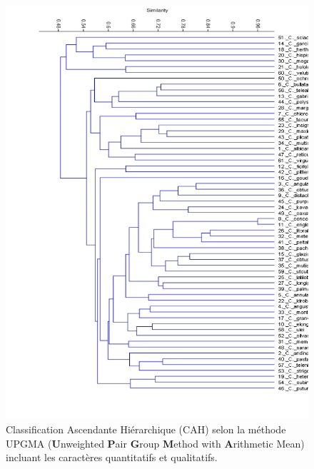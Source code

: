 \documentclass[a4paper]{article}
\theoremstyle{definition}
\theoremstyle{definition}
\theoremstyle{definition}
\theoremstyle{remark}
\begin{document}
\begin{figure}[H]

{\centering \includegraphics[width=1\linewidth]{figure/fig10a} 

}

\caption{Classification Ascendante Hiérarchique (CAH) selon la
méthode UPGMA (\textbf{U}nweighted \textbf{P}air \textbf{G}roup
\textbf{M}ethod with \textbf{A}rithmetic Mean) incluant les caractères
quantitatifs et qualitatifs.}\label{fig:fig10a}
\end{figure}
\end{document}
